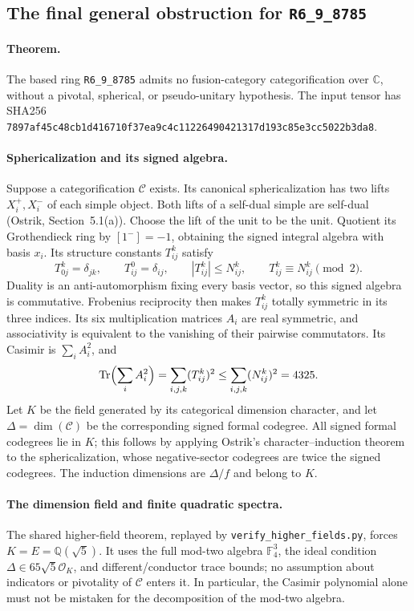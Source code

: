 \subsection{The final general obstruction for \texttt{R6\_9\_8785}}
\label{sec:completion8785}
\paragraph{Theorem.}
The based ring \texttt{R6\_9\_8785} admits no fusion-category
categorification over $\mathbb C$, without a pivotal, spherical, or
pseudo-unitary hypothesis. The input tensor has SHA256
\texttt{7897af45c48cb1d416710f37ea9c4c11226490421317d193c85e3cc5022b3da8}.

\paragraph{Sphericalization and its signed algebra.}
Suppose a categorification $\mathcal C$ exists. Its canonical
sphericalization has two lifts $X_i^+,X_i^-$ of each simple object.
Both lifts of a self-dual simple are self-dual (Ostrik, Section~5.1(a)).
Choose the lift of the unit to be the unit. Quotient its Grothendieck ring
by $[1^-]=-1$, obtaining the signed integral algebra with basis $x_i$.
Its structure constants $T_{ij}^k$ satisfy
\[
 T_{0j}^k=\delta_{jk},\qquad T_{ij}^0=\delta_{ij},\qquad
 |T_{ij}^k|\le N_{ij}^k,\qquad T_{ij}^k\equiv N_{ij}^k\pmod2.
\]
Duality is an anti-automorphism fixing every basis vector, so this signed
algebra is commutative. Frobenius reciprocity then makes $T_{ij}^k$
totally symmetric in its three indices. Its six multiplication matrices
$A_i$ are real symmetric, and associativity is equivalent to the
vanishing of their pairwise commutators. Its Casimir is
$\sum_i A_i^2$, and
\[
 \operatorname{Tr}\Bigl(\sum_i A_i^2\Bigr)
 =\sum_{i,j,k}(T_{ij}^k)^2\le\sum_{i,j,k}(N_{ij}^k)^2=4325.
\]
Let $K$ be the field generated by its categorical dimension character,
and let $\Delta=\dim(\mathcal C)$ be the corresponding signed formal
codegree. All signed formal codegrees lie in $K$; this follows by
applying Ostrik's character--induction theorem to the sphericalization,
whose negative-sector codegrees are twice the signed codegrees.
The induction dimensions are $\Delta/f$ and belong to $K$.

\paragraph{The dimension field and finite quadratic spectra.}
The shared higher-field theorem, replayed by
\texttt{verify\_higher\_fields.py}, forces $K=E=\mathbb Q(\sqrt5)$.
It uses the full mod-two algebra $\mathbb F_4^3$, the ideal condition
$\Delta\in65\sqrt5\mathcal O_K$, and different/conductor trace bounds;
no assumption about indicators or pivotality of $\mathcal C$ enters it.
In particular, the Casimir polynomial alone must not be mistaken for
the decomposition of the mod-two algebra.

